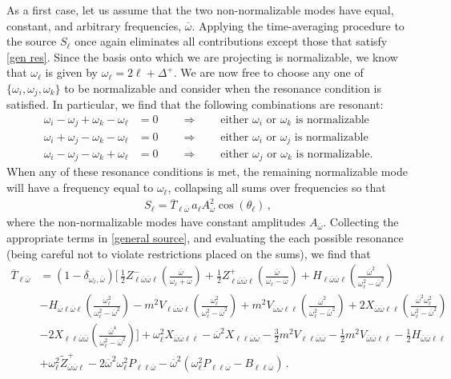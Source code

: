 \documentclass[letterpaper,11pt]{article}
\newcommand{\oi}{\omega_i}
\newcommand{\oj}{\omega_j}
\newcommand{\ok}{\omega_k}
\newcommand{\ol}{\omega_\ell}
\newcommand{\thl}{\theta_\ell}
\newcommand{\ob}{\overline{\omega}}
\begin{document}
As a first case, let us assume that the two non-normalizable modes have equal, constant, and arbitrary frequencies, $\ob$. Applying the time-averaging procedure to the source $S_\ell$ once again eliminates all contributions except those that satisfy \eqref{gen res}. Since the basis onto which we are projecting is normalizable, we know that $\omega_\ell$ is given by $\omega_\ell = 2\ell + \Delta^{+}$. We are now free to choose any one of $\{\omega_i, \omega_j, \ok\}$ to be normalizable and consider when the resonance condition is satisfied. In particular, we find that the following combinations are resonant:
\begin{align}
\label{gen nn res 1}
\oi - \oj + \ok - \ol &= 0 \qquad \Rightarrow \qquad \text{either $\oi$ or $\ok$ is normalizable} \\
\oi + \oj - \ok - \ol &= 0 \qquad \Rightarrow \qquad \text{either $\oi$ or $\oj$ is normalizable} \\
\oi - \oj - \ok + \ol &= 0 \qquad \Rightarrow \qquad \text{either $\oj$ or $\ok$ is normalizable.}
\label{gen nn res 2}
\end{align}
When any of these resonance conditions is met, the remaining normalizable mode will have a frequency equal to $\ol$, collapsing all sums over frequencies so that
\begin{align}
S_\ell = \overline{T}_{\ell \ob} \, a_\ell A_{\ob}^2 \cos (\thl) \, ,
\end{align}
where the non-normalizable modes have constant amplitudes $A_{\ob}$. Collecting the appropriate terms in \eqref{general source}, and evaluating the each possible resonance (being careful not to violate restrictions placed on the sums), we find that
\begin{align}
\label{S:2NN}
\overline{T}_{\ell \ob} &=  \left( 1 - \delta_{\ol, \ob} \right)\Big[ \, \frac{1}{2} Z^-_{\ell\ob\ob\ell} \left( \frac{\ob}{\ol + \ob} \right) + \frac{1}{2} Z^+_{\ell\ob\ob\ell} \left( \frac{\ob}{\ol - \ob} \right)  + H_{\ell \ob \ob \ell} \left( \frac{\ob^2}{\ol^2 - \ob^2} \right) \nonumber \\
%
& - H_{\ob\ell\ob\ell} \left(\frac{\ol^2}{\ol^2 - \ob^2} \right) - m^2 V_{\ell \ob\ob\ell}  \left(\frac{\ol^2}{\ol^2 - \ob^2} \right) + m^2 V_{\ob\ob\ell\ell} \left( \frac{\ob^2}{\ol^2 - \ob^2} \right) + 2 X_{\ob\ob\ell\ell} \left( \frac{\ob^2 \ol^2}{\ol^2 - \ob^2} \right) \nonumber \\
%
&  - 2 X_{\ell\ell\ob\ob} \left( \frac{\ob^4}{\ol^2 - \ob^2} \right) \Big] + \ol^2 X_{\ob\ob\ell\ell}  - \ob^2 X_{\ell\ell\ob\ob} - \frac{3}{2} m^2 V_{\ell\ell\ob\ob} - \frac{1}{2} m^2 V_{\ob\ob\ell\ell}  - \frac{1}{2} H_{\ob\ob\ell\ell} \nonumber \\
%
& + \ol^2 \tilde{Z}^+_{\ob\ob\ell} - 2 \ob^2 \ol^2 P_{\ell\ell\ob} - \ob^2 \left( \ol^2 P_{\ell\ell \ob} - B_{\ell\ell\ob} \right) \, .
\end{align}
\end{document}
